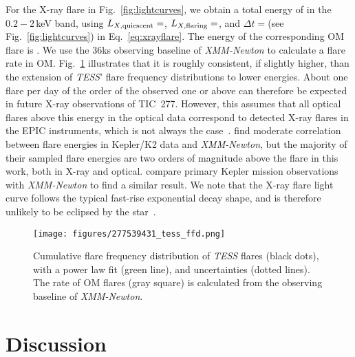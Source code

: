 \documentclass[twocolumn]{aastex631}
\begin{document}
For the X-ray flare in Fig.~\ref{fig:lightcurves}, we obtain a total energy of \eepic in the $0.2-2\,$keV band, using $L_{X,\rm quiescent}=$\LXquiet\unskip, $L_{X,\rm flaring}=$\LXflaring\unskip, and $\Delta t =$\xraydur\unskip (see Fig.~\ref{fig:lightcurves}) in Eq.~\ref{eq:xrayflare}. The energy of the corresponding OM flare is \eom\unskip. We use the 36ks observing baseline of \textit{XMM-Newton} to calculate a flare rate in OM. Fig.~\ref{fig:ffd} illustrates that it is roughly consistent, if slightly higher, than the extension of \textit{TESS}' flare frequency distributions to lower energies. About one flare per day of the order of the observed one or above can therefore be expected in future X-ray observations of TIC~277. However, this assumes that all optical flares above this energy in the optical data correspond to detected X-ray flares in the EPIC instruments, which is not always the case~\citep{paudel2021simultaneous}. \citet{guarcello2019simultaneous, kuznetsov2021stellar} find moderate correlation between flare energies in Kepler/K2 data and \textit{XMM-Newton}, but the majority of their sampled flare energies are two orders of magnitude above the flare in this work, both in X-ray and optical. \citet{kuznetsov2021stellar} compare primary Kepler mission observations with \textit{XMM-Newton} to find a similar result. We note that the X-ray flare light curve follows the typical fast-rise exponential decay shape, and is therefore unlikely to be eclipsed by the star~\citep{johnstone2012soft}.


\begin{figure}
    \begin{centering}
        \texttt{[image: figures/277539431\_tess\_ffd.png]}
        \caption{
         Cumulative flare frequency distribution of \textit{TESS} flares (black dots), with a power law fit (green line), and uncertainties (dotted lines). The rate of OM flares (gray square) is calculated from the observing baseline of \textit{XMM-Newton}. 
        }
        \label{fig:ffd}
    \end{centering}
\end{figure}

\section{Discussion}
\label{sec:discussion}
\end{document}
